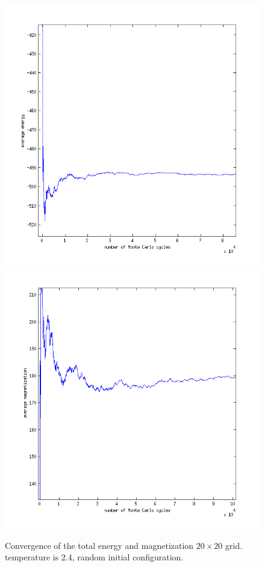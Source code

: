 \documentclass[a4paper,english, 10pt, twoside]{article}
\begin{document}
\begin{figure}[H]
 \includegraphics[scale=0.45]{energy_random_temp2dot4_zoom.png}
 \includegraphics[scale=0.45]{magnetization_random_temp2dot4_zoom}
 \caption{Convergence of the total energy and magnetization $20 \times 20$ grid. temperature is 2.4, random initial configuration.}
\label{magnet_random_temp2.4}
 \end{figure}
\end{document}
